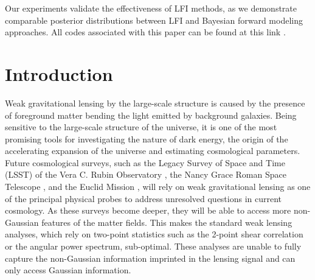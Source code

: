 \documentclass{aa}
\newcommand{\github}{\href{https://github.com/dlanzieri/WL_Implicit-Inference}{\faGithub}} %
\begin{document}
   {Our experiments validate the effectiveness of LFI methods, as we demonstrate comparable posterior distributions between LFI and Bayesian forward modeling approaches.
   All codes associated with this paper can be found at this link \github.}
   {}

   \maketitle

\section{Introduction}
Weak gravitational lensing by the large-scale structure is caused by the presence of foreground matter bending the light emitted by background galaxies. Being sensitive to the large-scale structure of the universe, it is one of the most promising tools for investigating the nature of dark energy, the origin of the accelerating expansion of the universe and estimating cosmological parameters. Future cosmological surveys, such as the Legacy Survey of Space and Time (LSST) of the Vera C. Rubin Observatory \citep{ivezic2019lsst}, the Nancy Grace Roman Space Telescope \citep{spergel2015wide}, and the Euclid Mission \citep{laureijs2011euclid}, will rely on weak gravitational lensing as one of the principal physical probes to address unresolved questions in current cosmology.
 As these surveys become deeper, they will be able to access more non-Gaussian features of the matter fields. This makes the standard weak lensing analyses, which rely on two-point statistics such as the 2-point shear correlation or the angular power spectrum, sub-optimal. These analyses are unable to fully capture the non-Gaussian information imprinted in the lensing signal and can only access Gaussian information.
\end{document}
